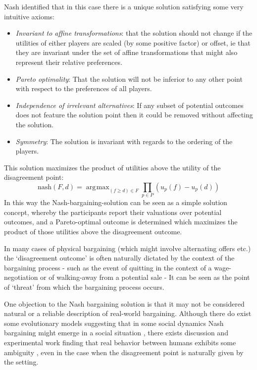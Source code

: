 \documentclass{article}
\DeclareMathOperator*{\argmax}{\arg\!\max}
\begin{document}
Nash identified that in this case there is a unique solution satisfying some very intuitive axioms:
\begin{itemize}
\item \textit{Invariant to affine transformations}: that the solution should not change if the utilities of either players are scaled (by some positive factor) or offset, ie that they are invariant under the set of affine transformations that might also represent their relative preferences.
\item \textit{Pareto optimality}: That the solution will not be inferior to any other point with respect to the preferences of all players.
\item \textit{Independence of irrelevant alternatives}: If any subset of potential outcomes does not feature the solution point then it could be removed without affecting the solution.
\item \textit{Symmetry}: The solution is invariant with regards to the ordering of the players.
\end{itemize}
This solution maximizes the product of utilities above the utility of the disagreement point:\cite{book1}
\begin{equation}\label{nash-product}\text{nash}(F,d) = \argmax_{(f\ge d)\in F}\prod_{p\in P}(u_p(f)-u_p(d))\end{equation}
In this way the Nash-bargaining-solution can be seen as a simple solution concept, whereby the participants report their valuations over potential outcomes, 
and a Pareto-optimal outcome is determined which maximizes the product of those utilities above the disagreement outcome.

In many cases of physical bargaining (which might involve alternating offers etc.) the `disagreement outcome' is often naturally dictated by the context of the bargaining process - 
such as the event of quitting in the context of a wage-negotiation or of walking-away from a potential sale
- It can be seen as the point of `threat' from which the bargaining process occurs.\cite{nash2}

One objection to the Nash bargaining solution is that it may not be considered natural or a reliable description of real-world bargaining.
Although there do exist some evolutionary models suggesting that in some social dynamics Nash bargaining might emerge in a social situation \cite{articlechoakihiko}, there exists discussion and experimental work finding that real behavior between humans exhibits some ambiguity \cite{KROLL2014261}, even in the case when the disagreement point is naturally given by the setting.
\end{document}
